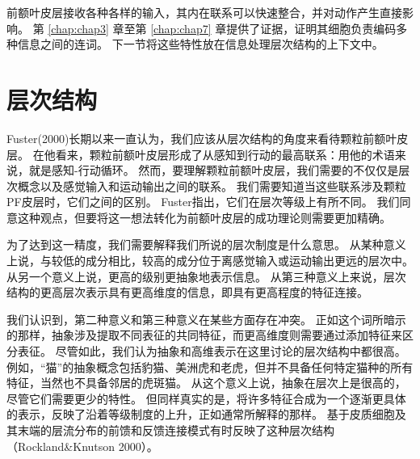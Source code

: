 前额叶皮层接收各种各样的输入，其内在联系可以快速整合，并对动作产生直接影响。
第 \ref{chap:chap3} 章至第 \ref{chap:chap7} 章提供了证据，证明其细胞负责编码多种信息之间的连词。
下一节将这些特性放在信息处理层次结构的上下文中。



\section{层次结构}
\par

Fuster(2000)长期以来一直认为，我们应该从层次结构的角度来看待颗粒前额叶皮层。
在他看来，颗粒前额叶皮层形成了从感知到行动的最高联系：用他的术语来说，就是感知-行动循环。
然而，要理解颗粒前额叶皮层，我们需要的不仅仅是层次概念以及感觉输入和运动输出之间的联系。
我们需要知道当这些联系涉及颗粒PF皮层时，它们之间的区别。
Fuster指出，它们在层次等级上有所不同。
我们同意这种观点，但要将这一想法转化为前额叶皮层的成功理论则需要更加精确。
\par


为了达到这一精度，我们需要解释我们所说的层次制度是什么意思。
从某种意义上说，与较低的成分相比，较高的成分位于离感觉输入或运动输出更远的层次中。
从另一个意义上说，更高的级别更抽象地表示信息。
从第三种意义上来说，层次结构的更高层次表示具有更高维度的信息，即具有更高程度的特征连接。
\par


我们认识到，第二种意义和第三种意义在某些方面存在冲突。
正如这个词所暗示的那样，抽象涉及提取不同表征的共同特征，而更高维度则需要通过添加特征来区分表征。
尽管如此，我们认为抽象和高维表示在这里讨论的层次结构中都很高。
例如，“猫”的抽象概念包括豹猫、美洲虎和老虎，但并不具备任何特定猫种的所有特征，当然也不具备邻居的虎斑猫。
从这个意义上说，抽象在层次上是很高的，尽管它们需要更少的特性。
但同样真实的是，将许多特征合成为一个逐渐更具体的表示，反映了沿着等级制度的上升，正如通常所解释的那样。
基于皮质细胞及其末端的层流分布的前馈和反馈连接模式有时反映了这种层次结构（Rockland\&Knutson 2000）。



